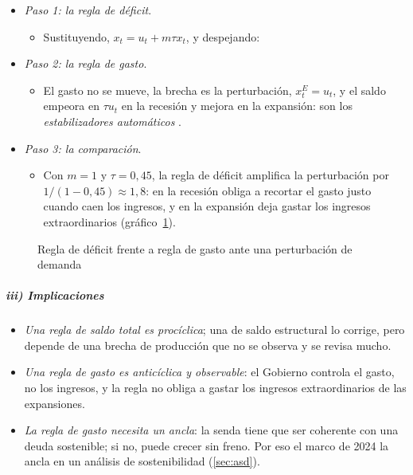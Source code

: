 \documentclass[11pt]{article}
\begin{document}
\begin{itemize}
\item \emph{Paso 1: la regla de déficit}.
  \begin{itemize}
  \item Sustituyendo, $x_t=u_t+m\tau x_t$, y despejando:
  \end{itemize}
\item \emph{Paso 2: la regla de gasto}.
  \begin{itemize}
  \item El gasto no se mueve, la brecha es la perturbación, $x^{E}_t=u_t$, y el saldo empeora en $\tau u_t$ en la recesión y mejora en la expansión: son los \emph{estabilizadores automáticos} .
  \end{itemize}
\item \emph{Paso 3: la comparación}.
  \begin{itemize}
  \item Con $m=1$ y $\tau=0{,}45$, la regla de déficit amplifica la perturbación por $1/(1-0{,}45)\approx1{,}8$: en la recesión obliga a recortar el gasto justo cuando caen los ingresos, y en la expansión deja gastar los ingresos extraordinarios (gráfico~\ref{fig:reglas}).
  \end{itemize}
\end{itemize}

\begin{figure}[H]
\centering
\caption{Regla de déficit frente a regla de gasto ante una perturbación de demanda}\label{fig:reglas}
\end{figure}

\subparagraph{iii) Implicaciones}

\begin{itemize}
\item \emph{Una regla de saldo total es procíclica}; una de saldo estructural lo corrige, pero depende de una brecha de producción que no se observa y se revisa mucho.
\item \emph{Una regla de gasto es anticíclica y observable}: el Gobierno controla el gasto, no los ingresos, y la regla no obliga a gastar los ingresos extraordinarios de las expansiones.
\item \emph{La regla de gasto necesita un ancla}: la senda tiene que ser coherente con una deuda sostenible; si no, puede crecer sin freno. Por eso el marco de 2024 la ancla en un análisis de sostenibilidad (\ref{sec:asd}).
\end{itemize}
\end{document}
